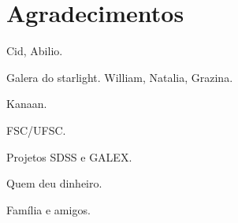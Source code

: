 


\chapter*{Agradecimentos}

Cid, Abilio.

Galera do starlight. William, Natalia, Grazina.

Kanaan.

FSC/UFSC.

Projetos SDSS e GALEX.

Quem deu dinheiro.

Família e amigos.

